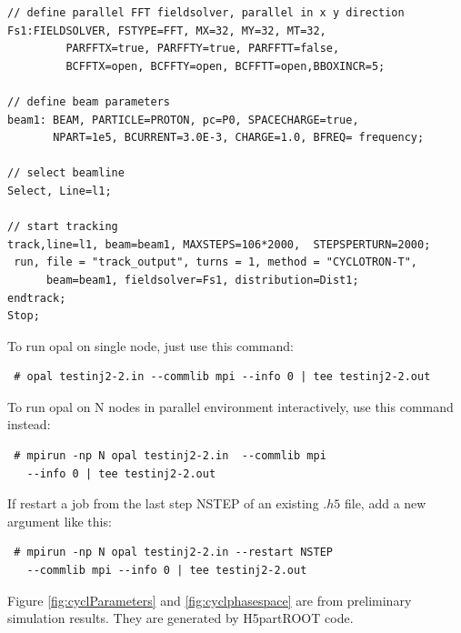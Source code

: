 {\begin{verbatim}
// define parallel FFT fieldsolver, parallel in x y direction
Fs1:FIELDSOLVER, FSTYPE=FFT, MX=32, MY=32, MT=32, 
		 PARFFTX=true, PARFFTY=true, PARFFTT=false,
		 BCFFTX=open, BCFFTY=open, BCFFTT=open,BBOXINCR=5;

// define beam parameters
beam1: BEAM, PARTICLE=PROTON, pc=P0, SPACECHARGE=true,
       NPART=1e5, BCURRENT=3.0E-3, CHARGE=1.0, BFREQ= frequency;

// select beamline
Select, Line=l1;

// start tracking
track,line=l1, beam=beam1, MAXSTEPS=106*2000,  STEPSPERTURN=2000;
 run, file = "track_output", turns = 1, method = "CYCLOTRON-T", 
      beam=beam1, fieldsolver=Fs1, distribution=Dist1;
endtrack;
Stop;
\end{verbatim}
}
To run opal on single node, just use this command:
{ \footnotesize 
\begin{verbatim}
 # opal testinj2-2.in --commlib mpi --info 0 | tee testinj2-2.out
\end{verbatim}
}
To run opal on N nodes in parallel environment interactively, use this command instead:
{ \footnotesize 
\begin{verbatim}
 # mpirun -np N opal testinj2-2.in  --commlib mpi 
   --info 0 | tee testinj2-2.out
\end{verbatim}
 }
If restart a job from the last step NSTEP of an existing $.h5$ file, add a new argument like this: 
{ \footnotesize 
\begin{verbatim}
 # mpirun -np N opal testinj2-2.in --restart NSTEP 
   --commlib mpi --info 0 | tee testinj2-2.out
\end{verbatim}
}
Figure \ref{fig:cyclParameters} and \ref{fig:cyclphasespace} are from preliminary simulation results.
They are generated by H5partROOT code.   
